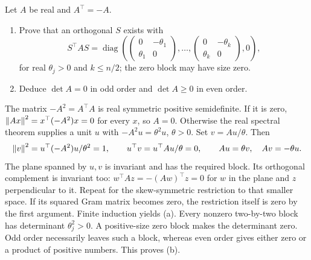 \begin{problem}\label{ex:09:skew-blocks}
Let \(A\) be real and \(A^\top=-A\).
\begin{enumerate}
\item Prove that an orthogonal \(S\) exists with
\[
 S^\top AS=\operatorname{diag}
 \left(\begin{pmatrix}0&-\theta_1\\\theta_1&0\end{pmatrix},
 \ldots,\begin{pmatrix}0&-\theta_k\\\theta_k&0\end{pmatrix},0\right),
\]
for real \(\theta_j>0\) and \(k\leqslant n/2\); the zero block may
have size zero.
\item Deduce \(\det A=0\) in odd order and \(\det A\geqslant0\)
in even order.
\end{enumerate}
\end{problem}
\begin{solution}
The matrix \(-A^2=A^\top A\) is real symmetric positive semidefinite.
If it is zero, \(\left\lVert Ax\right\rVert^2=x^\top(-A^2)x=0\) for every \(x\),
so \(A=0\).
Otherwise the real spectral theorem supplies a unit \(u\) with
\(-A^2u=\theta^2u\), \(\theta>0\).
Set \(v=Au/\theta\). Then
\[
 \left\lVert v\right\rVert^2=u^\top(-A^2)u/\theta^2=1,\qquad
 u^\top v=u^\top Au/\theta=0,
 \qquad Au=\theta v,\quad Av=-\theta u.
\]
The plane spanned by \(u,v\) is invariant and has the required block.
Its orthogonal complement is invariant too:
\(w^\top Az=-(Aw)^\top z=0\) for \(w\) in the plane and \(z\)
perpendicular to it.
Repeat for the skew-symmetric restriction to that smaller space.
If its squared Gram matrix becomes zero, the restriction itself is zero
by the first argument. Finite induction yields (a).
Every nonzero two-by-two block has determinant \(\theta_j^2>0\).
A positive-size zero block makes the determinant zero.
Odd order necessarily leaves such a block, whereas even order gives
either zero or a product of positive numbers. This proves (b).
\end{solution}

